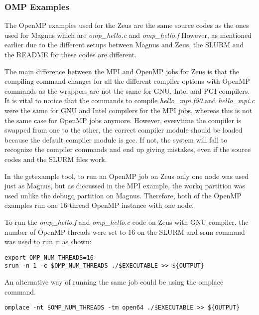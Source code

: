 \subsubsection{OMP Examples}

The OpenMP examples used for the Zeus are the same source codes as the ones used for Magnus which are \emph{omp\_hello.c} and \emph{omp\_hello.f}
However, as mentioned earlier due to the different setups between Magnus and Zeus, the SLURM and the README for these codes are different.

The main difference between the MPI and OpenMP jobs for Zeus is that the compiling command changes for all the different compiler options with OpenMP
commands as the wrappers are not the same for GNU, Intel and PGI compilers. It is vital to notice that the commands to compile \emph{hello\_mpi.f90} and
\emph{hello\_mpi.c} were the same for GNU and Intel compilers for the MPI jobs, whereas this is not the same case for OpenMP jobs anymore. However, 
everytime the compiler is swapped from one to the other, the correct compiler module should be loaded because the default compiler module is gcc. If not, 
the system will fail to recognize the compiler commands and end up giving mistakes, even if the source codes and the SLURM files work.

In the getexample tool, to run an OpenMP job on Zeus only one node was used just as Magnus, but as diccussed in the MPI example, the workq partition was
used unlike the debugq partition on Magnus. Therefore, both of the OpenMP examples run one 16-thread OpenMP instance with one node.

To run the \emph{omp\_hello.f} and \emph{omp\_hello.c} code on Zeus with GNU compiler, the number of OpenMP threads were set to 16 on the SLURM and srun 
command was used to run it as shown:

\begin{tcolorbox}
\begin{Verbatim}[fontsize=\scriptsize]
export OMP_NUM_THREADS=16
srun -n 1 -c $OMP_NUM_THREADS ./$EXECUTABLE >> ${OUTPUT}
\end{Verbatim}
\end{tcolorbox}

An alternative way of running the same job could be using the omplace command.

\begin{tcolorbox}
\begin{Verbatim}[fontsize=\scriptsize]
omplace -nt $OMP_NUM_THREADS -tm open64 ./$EXECUTABLE >> ${OUTPUT}
\end{Verbatim}
\end{tcolorbox}

